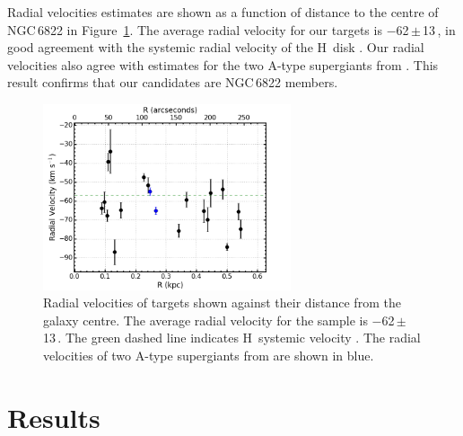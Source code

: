 Radial velocities estimates are shown as a function of distance to the centre of NGC\,6822 in Figure~\ref{fig:RvsRV}.
The average radial velocity for our targets is $-$62\,$\pm$\,13\,\kms,
in good agreement with the systemic radial velocity of the H\,\1 disk
\citep[$-$57\,$\pm$\,2\,\kms;][]{2004AJ....128...16K}.
Our radial velocities also agree with estimates for the two A-type supergiants from
\cite{2001ApJ...547..765V}.
This result confirms that our candidates are NGC\,6822 members.

\begin{figure}
 \centering
\includegraphics[width=0.65\textwidth]{ngc6822/N6822_RvsRV-v2}
\caption[Radial velocities shown against distance from galaxy centre]{
Radial velocities of targets shown against their distance from the galaxy centre.
The average radial velocity for the sample is $-$62\,$\pm$\,13\,\kms.
The green dashed line indicates H\,\1 systemic velocity
\protect\citep[$-$57\,$\pm$\,2\,\kms;][]{2004AJ....128...16K}.
The radial velocities of two A-type supergiants from
\protect\cite{2001ApJ...547..765V} are shown in blue.
        }
\label{fig:RvsRV}
\end{figure}



\section{Results} %
\label{sec:ngc6822results}

